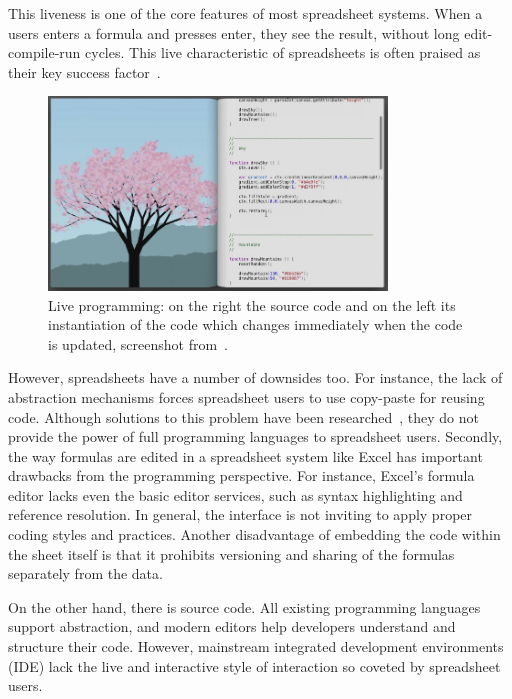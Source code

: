 \documentclass{llncs}
\newcommand{\todo}[1]{\textbf{#1}}
\begin{document}
This liveness is one of the core features of most spreadsheet systems. When a users enters a formula and presses enter, they see the result, without long edit-compile-run cycles. This live characteristic of spreadsheets is often praised as their key success factor~\cite{HermansPhD}.
\begin{figure}
  \begin{center}
  \includegraphics[width=9cm]{fig/bret.png}
  \caption{Live programming: on the right the source code and on the left its instantiation of the code which changes immediately when the code is updated, screenshot from~\cite{Victor2012}.}
  \label{fig:bret}
  \end{center}
\end{figure} 
However, spreadsheets have a number of downsides too. For instance, the lack of  abstraction mechanisms forces spreadsheet users to use copy-paste for reusing code. Although solutions to this problem have been researched~\cite{hermans_2015_19341,jones2003user}, they do not provide the power of full programming languages to spreadsheet users. Secondly, the way formulas are edited in a spreadsheet system like Excel has important drawbacks from the programming perspective. For instance, Excel's formula editor lacks even the basic editor services, such as  syntax highlighting and reference resolution.  In general, the interface is not inviting to apply proper coding styles and practices. Another disadvantage of embedding the code within the sheet itself is that it prohibits versioning and sharing of the formulas separately from the data. 

On the other hand, there is source code. All existing programming languages support abstraction, and modern editors help developers understand and structure their code. However, mainstream integrated development environments (IDE) lack the live and interactive style of interaction so coveted by spreadsheet users.
\end{document}
